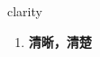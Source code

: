 
\begin{frame}
{\huge clarity}
\begin{center}
\begin{enumerate}\Large
  \item \textbf{清晰，清楚}
\end{enumerate}
\end{center}
\end{frame}
